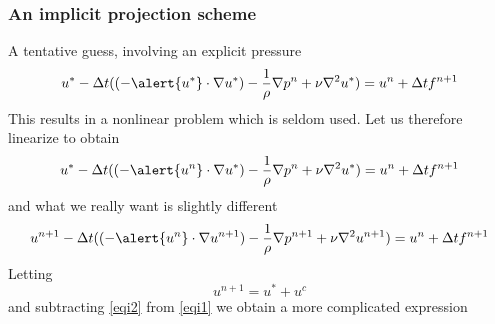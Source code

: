 \begin{frame}
\frametitle{An implicit projection scheme}
A tentative guess, involving an explicit pressure
\[   
u^{*}  - \Delta t (( -\alert{u^*} \cdot \nabla u^*)
    -\frac{1}{\rho}\nabla p^n  + \nu \nabla^2 u^*)    = u^n  + \Delta t f^{n+1}
\]
This results in a nonlinear problem which is seldom used. Let us therefore linearize to
obtain 
\begin{equation}   
\label{eqi1}
u^{*}  - \Delta t (( -\alert{u^n} \cdot \nabla u^*)
    -\frac{1}{\rho}\nabla p^n  + \nu \nabla^2 u^*)    = u^n  + \Delta t f^{n+1}
\end{equation}   
and what we really want is slightly different 
\begin{equation}   
\label{eqi2}
u^{n+1}  - \Delta t (( -\alert{u^n} \cdot \nabla u^{n+1})
    -\frac{1}{\rho}\nabla p^{n+1}  + \nu \nabla^2 u^{n+1})    = u^n  + \Delta t f^{n+1}
\end{equation}   
Letting
\[
u^{n+1} = u^* + u^c 
\]
and subtracting \eqref{eqi2} from \eqref{eqi1} we obtain 
a more complicated expression 





\end{frame}
